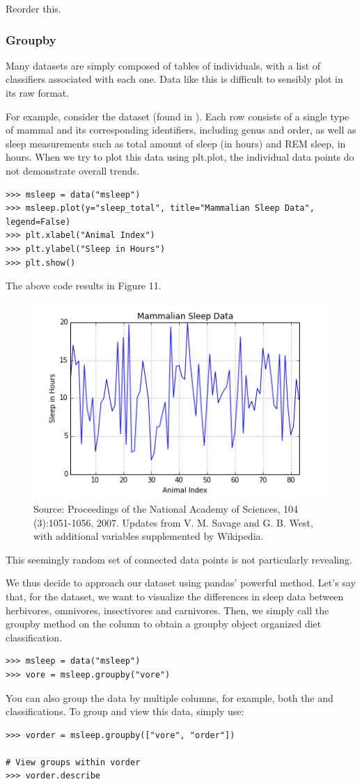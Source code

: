 Reorder this.

\subsubsection*{Groupby}
Many datasets are simply composed of tables of individuals, with a list of classifiers associated with each one.
Data like this is difficult to sensibly plot in its raw format.

For example, consider the  dataset (found in ). 
Each row consists of a single type of mammal and its corresponding identifiers, including genus and order, as well as sleep measurements such as total amount of sleep (in hours) and REM sleep, in hours.
When we try to plot this data using plt.plot, the individual data points do not demonstrate overall trends.
\begin{lstlisting}
>>> msleep = data("msleep")
>>> msleep.plot(y="sleep_total", title="Mammalian Sleep Data", legend=False)
>>> plt.xlabel("Animal Index")
>>> plt.ylabel("Sleep in Hours")
>>> plt.show()
\end{lstlisting}
The above code results in Figure 11.
\begin{figure}[H] 
    \centering
    \includegraphics[width=.75\textwidth]{Msleep1.png}
    \caption{Source:  Proceedings of the National Academy of Sciences, 104 (3):1051-1056, 2007. Updates from V. M. Savage and G. B. West, with additional variables supplemented by Wikipedia.}
    \label{fig:aplot}
\end{figure}
This seemingly random set of connected data points is not particularly revealing.

We thus decide to approach our dataset using pandas' powerful  method. 
Let's say that, for the  dataset, we want to visualize the differences in sleep data between herbivores, omnivores, insectivores and carnivores.
Then, we simply call the groupby method on the  column to obtain a groupby object organized diet classification.
\begin{lstlisting}
>>> msleep = data("msleep")
>>> vore = msleep.groupby("vore")
\end{lstlisting}
You can also group the data by multiple columns, for example, both the  and  classifications.
To group and view this data, simply use:
\begin{lstlisting}
>>> vorder = msleep.groupby(["vore", "order"])

# View groups within vorder
>>> vorder.describe
\end{lstlisting}


